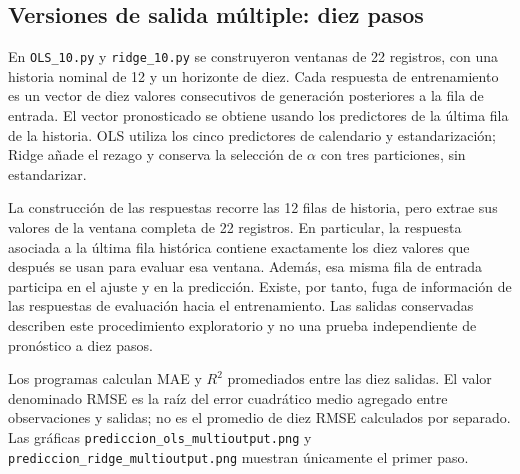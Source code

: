 \subsection{Versiones de salida múltiple: diez pasos}
\label{subsec:lineales-multi}

En \texttt{OLS\_10.py} y \texttt{ridge\_10.py} se construyeron ventanas de 22 registros, con una historia nominal de 12 y un horizonte de diez. Cada respuesta de entrenamiento es un vector de diez valores consecutivos de generación posteriores a la fila de entrada. El vector pronosticado se obtiene usando los predictores de la última fila de la historia. OLS utiliza los cinco predictores de calendario y estandarización; Ridge añade el rezago y conserva la selección de $\alpha$ con tres particiones, sin estandarizar.

La construcción de las respuestas recorre las 12 filas de historia, pero extrae sus valores de la ventana completa de 22 registros. En particular, la respuesta asociada a la última fila histórica contiene exactamente los diez valores que después se usan para evaluar esa ventana. Además, esa misma fila de entrada participa en el ajuste y en la predicción. Existe, por tanto, fuga de información de las respuestas de evaluación hacia el entrenamiento. Las salidas conservadas describen este procedimiento exploratorio y no una prueba independiente de pronóstico a diez pasos.

Los programas calculan MAE y $R^2$ promediados entre las diez salidas. El valor denominado RMSE es la raíz del error cuadrático medio agregado entre observaciones y salidas; no es el promedio de diez RMSE calculados por separado. Las gráficas \texttt{prediccion\_ols\_multioutput.png} y \texttt{prediccion\_ridge\_multioutput.png} muestran únicamente el primer paso.
